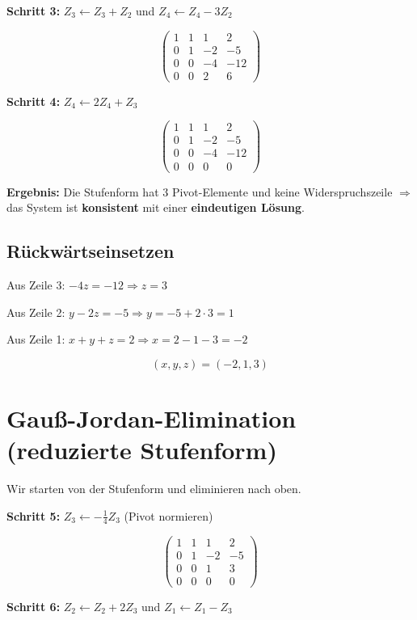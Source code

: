 \documentclass[a4paper,12pt]{article}
\begin{document}
\textbf{Schritt 3:} $Z_3 \leftarrow Z_3 + Z_2$ und $Z_4 \leftarrow Z_4 - 3Z_2$

\[
\left(\begin{array}{ccc|c}
1 & 1 & 1 & 2 \\
0 & 1 & -2 & -5 \\
0 & 0 & -4 & -12 \\
0 & 0 & 2 & 6
\end{array}\right)
\]

\textbf{Schritt 4:} $Z_4 \leftarrow 2Z_4 + Z_3$

\[
\left(\begin{array}{ccc|c}
1 & 1 & 1 & 2 \\
0 & 1 & -2 & -5 \\
0 & 0 & -4 & -12 \\
0 & 0 & 0 & 0
\end{array}\right)
\]

\textbf{Ergebnis:} Die Stufenform hat 3 Pivot-Elemente und keine Widerspruchszeile $\Rightarrow$ das System ist \textbf{konsistent} mit einer \textbf{eindeutigen Lösung}.

\subsection*{Rückwärtseinsetzen}

Aus Zeile 3: $-4z = -12 \Rightarrow z = 3$

Aus Zeile 2: $y - 2z = -5 \Rightarrow y = -5 + 2 \cdot 3 = 1$

Aus Zeile 1: $x + y + z = 2 \Rightarrow x = 2 - 1 - 3 = -2$

\[
\boxed{(x, y, z) = (-2, 1, 3)}
\]

\section*{Gauß-Jordan-Elimination (reduzierte Stufenform)}

Wir starten von der Stufenform und eliminieren nach oben.

\textbf{Schritt 5:} $Z_3 \leftarrow -\frac{1}{4} Z_3$ (Pivot normieren)

\[
\left(\begin{array}{ccc|c}
1 & 1 & 1 & 2 \\
0 & 1 & -2 & -5 \\
0 & 0 & 1 & 3 \\
0 & 0 & 0 & 0
\end{array}\right)
\]

\textbf{Schritt 6:} $Z_2 \leftarrow Z_2 + 2Z_3$ und $Z_1 \leftarrow Z_1 - Z_3$
\end{document}
